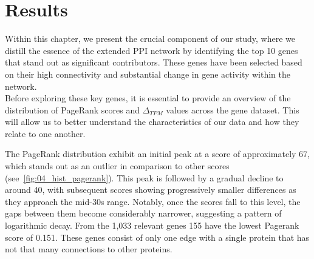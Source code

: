 \section{Results} \label{sec:results}
Within this chapter, we present the crucial component of our study,
where we distill the essence of the extended PPI network by identifying the top 10 genes that stand out as significant contributors.
These genes have been selected based on their high connectivity and substantial change in gene activity within the network.\\

Before exploring these key genes,
it is essential to provide an overview of the distribution of PageRank scores and $\Delta_{TPM}$ values across the gene dataset.
This will allow us to better understand the characteristics of our data and how they relate to one another.

The PageRank distribution exhibit an initial peak at a score of approximately 67,
which stands out as an outlier in comparison to other scores (see~\cref{fig:04_hist_pagerank}).
This peak is followed by a gradual decline to around 40, with subsequent scores showing progressively smaller differences
as they approach the mid-30s range.
Notably, once the scores fall to this level, the gaps between them become considerably narrower,
suggesting a pattern of logarithmic decay.
From the 1,033 relevant genes 155 have the lowest Pagerank score of 0.151.
These genes consist of only one edge with a single protein that has not that many connections to other proteins.\\

